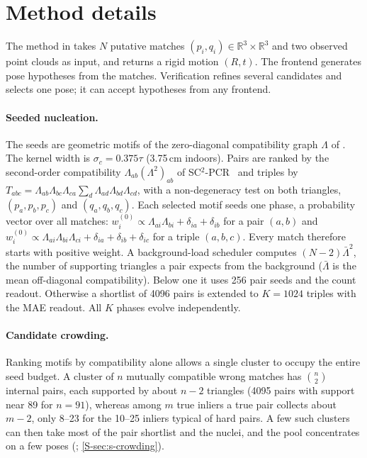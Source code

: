 \section{Method details}
\label{S-sec:s-method}

The method in  takes $N$ putative matches $(p_i,q_i)\in\mathbb{R}^3\times\mathbb{R}^3$ and two observed point clouds as input, and returns a rigid motion $(R,t)$. The \ngr{} frontend generates pose hypotheses from the matches. Verification refines several candidates and selects one pose; it can accept hypotheses from any frontend.

\paragraph{Seeded nucleation.} The seeds are geometric motifs of the zero-diagonal compatibility graph $\Lambda$ of . The kernel width is $\sigma_c=0.375\tau$ (3.75\,cm indoors). Pairs are ranked by the second-order compatibility $\Lambda_{ab}(\Lambda^2)_{ab}$ of SC$^2$-PCR~\cite{chen2022sc2} and triples by $T_{abc}=\Lambda_{ab}\Lambda_{bc}\Lambda_{ca}\sum_d\Lambda_{ad}\Lambda_{bd}\Lambda_{cd}$, with a non-degeneracy test on both triangles, $(p_a,p_b,p_c)$ and $(q_a,q_b,q_c)$. Each selected motif seeds one phase, a probability vector over all matches: $w_i^{(0)}\propto\Lambda_{ai}\Lambda_{bi}+\delta_{ia}+\delta_{ib}$ for a pair $(a,b)$ and $w_i^{(0)}\propto\Lambda_{ai}\Lambda_{bi}\Lambda_{ci}+\delta_{ia}+\delta_{ib}+\delta_{ic}$ for a triple $(a,b,c)$. Every match therefore starts with positive weight. A background-load scheduler computes $(N-2)\bar\Lambda^2$, the number of supporting triangles a pair expects from the background ($\bar\Lambda$ is the mean off-diagonal compatibility). Below one it uses 256 pair seeds and the count readout. Otherwise a shortlist of 4096 pairs is extended to $K=1024$ triples with the MAE readout. All $K$ phases evolve independently.

\paragraph{Candidate crowding.} Ranking motifs by compatibility alone allows a single cluster to occupy the entire seed budget. A cluster of $n$ mutually compatible wrong matches has $\binom{n}{2}$ internal pairs, each supported by about $n-2$ triangles (4095 pairs with support near 89 for $n=91$), whereas among $m$ true inliers a true pair collects about $m-2$, only 8--23 for the 10--25 inliers typical of hard pairs. A few such clusters can then take most of the pair shortlist and the nuclei, and the pool concentrates on a few poses (; \cref{S-sec:s-crowding}).

